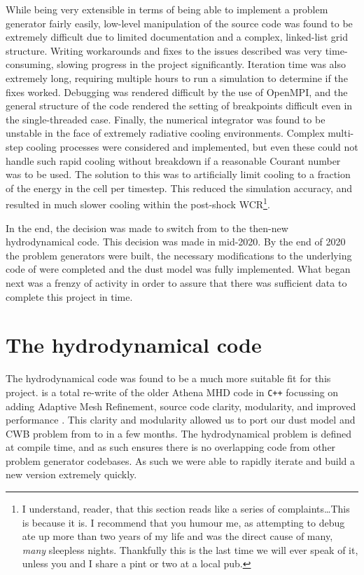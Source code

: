 While being very extensible in terms of being able to implement a problem generator fairly easily, low-level manipulation of the \mg{} source code was found to be extremely difficult due to limited documentation and a complex, linked-list grid structure.
Writing workarounds and fixes to the issues described was very time-consuming, slowing progress in the project significantly.
Iteration time was also extremely long, requiring multiple hours to run a simulation to determine if the fixes worked.
Debugging was rendered difficult by the use of OpenMPI, and the general structure of the code rendered the setting of breakpoints difficult even in the single-threaded case.
Finally, the numerical integrator was found to be unstable in the face of extremely radiative cooling environments.
Complex multi-step cooling processes were considered and implemented, but even these could not handle such rapid cooling without breakdown if a reasonable Courant number was to be used.
The solution to this was to artificially limit cooling to a fraction of the energy in the cell per timestep.
This reduced the simulation accuracy, and resulted in much slower cooling within the post-shock WCR\footnote{I understand, reader, that this section reads like a series of complaints\ldots This is because it is. I recommend that you humour me, as attempting to debug \mg{} ate up more than two years of my life and was the direct cause of many, \textit{many} sleepless nights. Thankfully this is the last time we will ever speak of it, unless you and I share a pint or two at a local pub.}.

In the end, the decision was made to switch from \mg{} to the then-new \athena{} hydrodynamical code.
This decision was made in mid-2020.
By the end of 2020 the problem generators were built, the necessary modifications to the underlying code of \athena{} were completed and the dust model was fully implemented.
What began next was a frenzy of activity in order to assure that there was sufficient data to complete this project in time.

\section{The \athena{} hydrodynamical code}
\label{sec:athenapp}

The  hydrodynamical code was found to be a much more suitable fit for this project.
\athena{} is a total re-write of the older Athena MHD code in \texttt{C++} focussing on adding Adaptive Mesh Refinement, source code clarity, modularity, and improved performance \parencite{stoneAthenaAdaptiveMesh2020}.
This clarity and modularity allowed us to port our dust model and CWB problem from \mg{} to \athena{} in a few months.
The hydrodynamical problem is defined at compile time, and as such ensures there is no overlapping code from other problem generator codebases.
As such we were able to rapidly iterate and build a new version extremely quickly.

